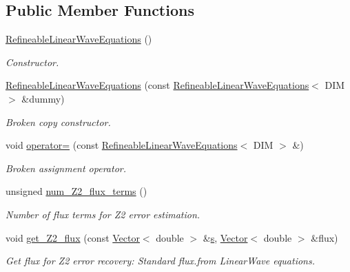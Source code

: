 \subsection*{Public Member Functions}
\begin{DoxyCompactItemize}
\item 
\hyperlink{classoomph_1_1RefineableLinearWaveEquations_a40fca9fa73b5e7f2cdbd4725a41777f2}{Refineable\+Linear\+Wave\+Equations} ()
\begin{DoxyCompactList}\small\item\em Constructor. \end{DoxyCompactList}\item 
\hyperlink{classoomph_1_1RefineableLinearWaveEquations_a7d87bef5939e692cb79739718b89399d}{Refineable\+Linear\+Wave\+Equations} (const \hyperlink{classoomph_1_1RefineableLinearWaveEquations}{Refineable\+Linear\+Wave\+Equations}$<$ D\+IM $>$ \&dummy)
\begin{DoxyCompactList}\small\item\em Broken copy constructor. \end{DoxyCompactList}\item 
void \hyperlink{classoomph_1_1RefineableLinearWaveEquations_a2a71c6a176c35fa60170677f1dfc5799}{operator=} (const \hyperlink{classoomph_1_1RefineableLinearWaveEquations}{Refineable\+Linear\+Wave\+Equations}$<$ D\+IM $>$ \&)
\begin{DoxyCompactList}\small\item\em Broken assignment operator. \end{DoxyCompactList}\item 
unsigned \hyperlink{classoomph_1_1RefineableLinearWaveEquations_a83b2ad0eb1bbcfe802b48d433d104f3d}{num\+\_\+\+Z2\+\_\+flux\+\_\+terms} ()
\begin{DoxyCompactList}\small\item\em Number of \textquotesingle{}flux\textquotesingle{} terms for Z2 error estimation. \end{DoxyCompactList}\item 
void \hyperlink{classoomph_1_1RefineableLinearWaveEquations_af5b91e3507fc1ef71d9e1e1d9d0b4fe2}{get\+\_\+\+Z2\+\_\+flux} (const \hyperlink{classoomph_1_1Vector}{Vector}$<$ double $>$ \&\hyperlink{cfortran_8h_ab7123126e4885ef647dd9c6e3807a21c}{s}, \hyperlink{classoomph_1_1Vector}{Vector}$<$ double $>$ \&flux)
\begin{DoxyCompactList}\small\item\em Get \textquotesingle{}flux\textquotesingle{} for Z2 error recovery\+: Standard flux.\+from Linear\+Wave equations. \end{DoxyCompactList}\item 

\end{DoxyCompactItemize}
